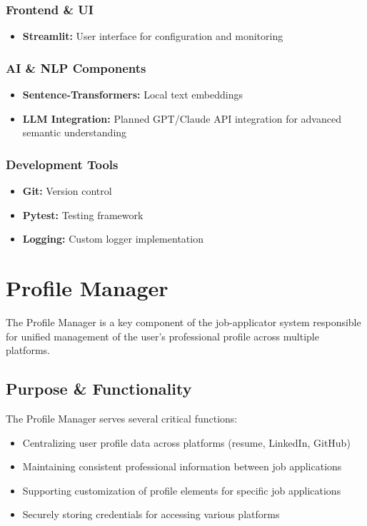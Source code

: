 \documentclass[a4paper,12pt]{article}
\begin{document}
\subsubsection{Frontend \& UI}
\begin{itemize}
    \item \textbf{Streamlit:} User interface for configuration and monitoring
\end{itemize}

\subsubsection{AI \& NLP Components}
\begin{itemize}
    \item \textbf{Sentence-Transformers:} Local text embeddings
    \item \textbf{LLM Integration:} Planned GPT/Claude API integration for advanced semantic understanding
\end{itemize}

\subsubsection{Development Tools}
\begin{itemize}
    \item \textbf{Git:} Version control
    \item \textbf{Pytest:} Testing framework
    \item \textbf{Logging:} Custom logger implementation
\end{itemize}

\newpage



\section{Profile Manager}

The Profile Manager is a key component of the job-applicator system responsible for unified management of the user's professional profile across multiple platforms.

\subsection{Purpose \& Functionality}
The Profile Manager serves several critical functions:

\begin{itemize}
    \item Centralizing user profile data across platforms (resume, LinkedIn, GitHub)
    \item Maintaining consistent professional information between job applications
    \item Supporting customization of profile elements for specific job applications
    \item Securely storing credentials for accessing various platforms
\end{itemize}
\end{document}
